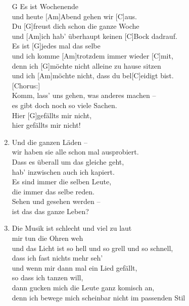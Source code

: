\def\Titel{Hier gefällts mir nicht}
\def\Interpret{Mono für Alle!}
\def\Referenz{}

\LiedSetup{}

\begin{guitarMagic}
    \begin{enumerate}
        \item [G]Es ist Wochenende\\
            und heute [Am]Abend gehen wir [C]aus.\\
            Du [G]freust dich schon die ganze Woche\\
            und [Am]ich hab' überhaupt keinen [C]Bock dadrauf.\\
            Es ist [G]jedes mal das selbe\\
            und ich komme [Am]trotzdem immer wieder [C]mit,\\
            denn ich [G]möchte nicht alleine zu hause sitzen\\
            und ich [Am]möchte nicht, dass du bel[C]eidigt bist.\\

            [Chorus:]\\
            [Am]Komm, lass' uns gehen, was anderes machen –\\
            [C]es gibt doch noch so viele Sachen.\\
            Hier [G]gefällts mir nicht,\\
            hier gefällts mir nicht!

            \liedweiter
        \item Und die ganzen Läden –\\
            wir haben sie alle schon mal ausprobiert.\\
            Dass es überall um das gleiche geht,\\
            hab' inzwischen auch ich kapiert.\\
            Es sind immer die selben Leute,\\
            die immer das selbe reden.\\
            Sehen und gesehen werden –\\
            ist das das ganze Leben?

        \item Die Musik ist schlecht und viel zu laut\\
            mir tun die Ohren weh\\
            und das Licht ist so hell und so grell und so schnell,\\
            dass ich fast nichts mehr seh'\\
            und wenn mir dann mal ein Lied gefällt,\\
            so dass ich tanzen will,\\
            dann gucken mich die Leute ganz komisch an,\\
            denn ich bewege mich scheinbar nicht im passenden Stil
    \end{enumerate}
\end{guitarMagic}
